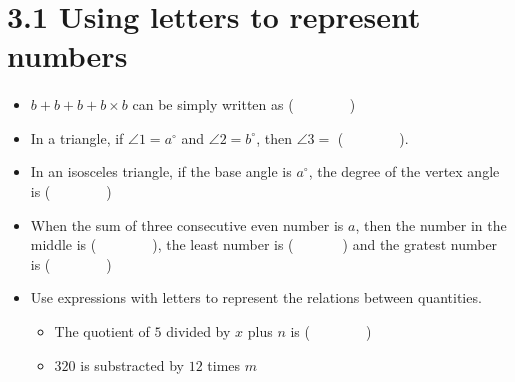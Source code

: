 \documentclass[12pt]{article}
\begin{document}
\maketitle

\section{3.1 Using letters to represent numbers}

\paragraph{}
\begin{itemize}
    \item $b+b+b+b\times b$ can be simply written as (~~~~~~~~)
    \item In a triangle, if $\angle 1=a^{\circ}$ and $\angle 2=b^{\circ}$, then $\angle 3=$ (~~~~~~~~).
    \item In an isosceles triangle, if the base angle is $a^{\circ}$, the degree of the vertex angle is (~~~~~~~~)    
    \item When the sum of three consecutive even number is $a$, then the number in the middle is (~~~~~~~~), the least number is (~~~~~~~) and the gratest number is (~~~~~~~~)
    \item Use expressions with letters to represent the relations between quantities.
    \begin{itemize}
        \item The quotient of $5$ divided by $x$ plus $n$ is (~~~~~~~~)
        \item $320$ is substracted by $12$ times $m$
    \end{itemize}
\end{itemize}
\end{document}
